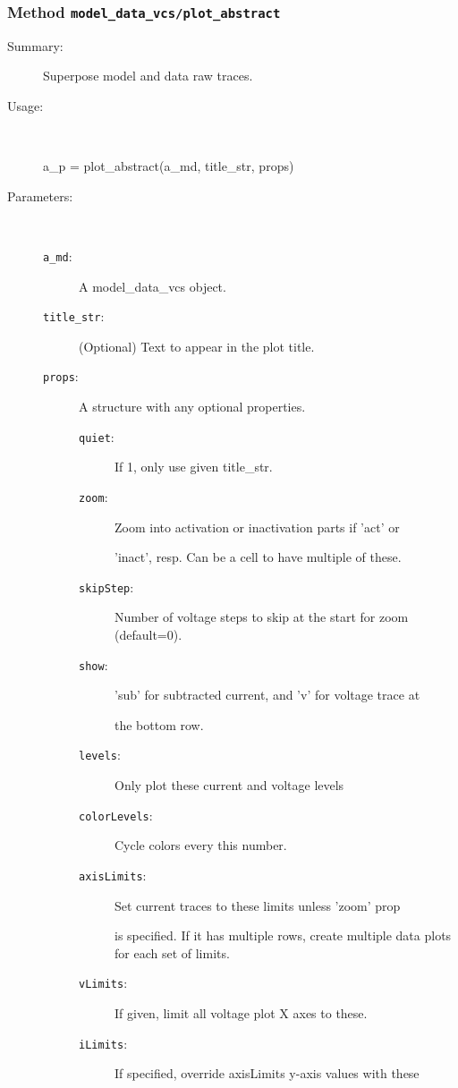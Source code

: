 \subsubsection[Method \texttt{plot\_abstract}]{Method \texttt{model\_data\_vcs/plot\_abstract}}%
%
\label{ref_model_data_vcs__plot_abstract}%
\hypertarget{ref_model_data_vcs__plot_abstract}{}%
\begin{description}
\item[Summary:]Superpose model and data raw traces.
%
\item[Usage:]~%
\begin{lyxcode}%
a\_p = plot\_abstract(a\_md, title\_str, props)
%
\end{lyxcode}%
%
%
\item[Parameters:]~
\begin{description}%
\item[\texttt{a\_md}:]
 A model\_data\_vcs object.
\item[\texttt{title\_str}:]
 (Optional) Text to appear in the plot title.
\item[\texttt{props}:]
 A structure with any optional properties.
\begin{description}%
\item[\texttt{quiet}:]
 If 1, only use given title\_str.
\item[\texttt{zoom}:]
 Zoom into activation or inactivation parts if 'act' or

'inact', resp. Can be a cell to have multiple of these.
\item[\texttt{skipStep}:]
 Number of voltage steps to skip at the start for zoom (default=0).
\item[\texttt{show}:]
 'sub' for subtracted current, and 'v' for voltage trace at

the bottom row.
\item[\texttt{levels}:]
 Only plot these current and voltage levels
\item[\texttt{colorLevels}:]
 Cycle colors every this number.
\item[\texttt{axisLimits}:]
 Set current traces to these limits unless 'zoom' prop

is specified. If it has multiple rows, create multiple data
plots for each set of limits.
\item[\texttt{vLimits}:]
 If given, limit all voltage plot X axes to these.
\item[\texttt{iLimits}:]
 If specified, override axisLimits y-axis values with these


\end{description}
\end{description}
\end{description}
